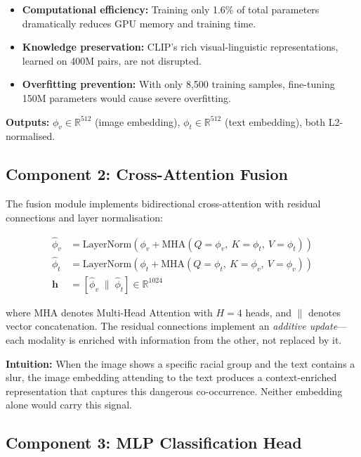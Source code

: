 \documentclass[12pt,a4paper]{article}
\begin{document}
\begin{itemize}
  \item \textbf{Computational efficiency:} Training only 1.6\% of total parameters dramatically reduces GPU memory and training time.
  \item \textbf{Knowledge preservation:} CLIP's rich visual-linguistic representations, learned on 400M pairs, are not disrupted.
  \item \textbf{Overfitting prevention:} With only 8,500 training samples, fine-tuning 150M parameters would cause severe overfitting.
\end{itemize}

\textbf{Outputs:} $\phi_v \in \mathbb{R}^{512}$ (image embedding), $\phi_t \in \mathbb{R}^{512}$ (text embedding), both L2-normalised.

\subsection{Component 2: Cross-Attention Fusion}

The fusion module implements bidirectional cross-attention with residual connections and layer normalisation:

\begin{align}
  \hat{\phi}_v &= \text{LayerNorm}\!\left(\phi_v + \text{MHA}(Q\!=\!\phi_v,\ K\!=\!\phi_t,\ V\!=\!\phi_t)\right) \\
  \hat{\phi}_t &= \text{LayerNorm}\!\left(\phi_t + \text{MHA}(Q\!=\!\phi_t,\ K\!=\!\phi_v,\ V\!=\!\phi_v)\right) \\
  \mathbf{h} &= \left[\hat{\phi}_v \;\|\; \hat{\phi}_t\right] \in \mathbb{R}^{1024}
\end{align}

where MHA denotes Multi-Head Attention with $H=4$ heads, and $\|$ denotes vector concatenation. The residual connections implement an \textit{additive update}---each modality is enriched with information from the other, not replaced by it.

\textbf{Intuition:} When the image shows a specific racial group and the text contains a slur, the image embedding attending to the text produces a context-enriched representation that captures this dangerous co-occurrence. Neither embedding alone would carry this signal.

\subsection{Component 3: MLP Classification Head}
\end{document}
